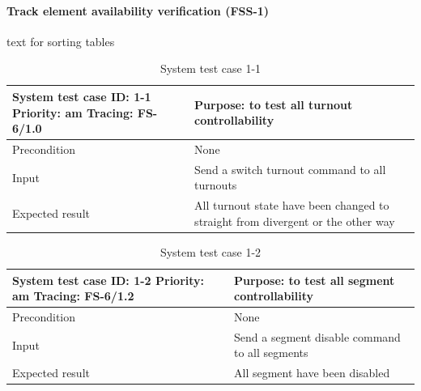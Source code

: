 \paragraph{Track element availability verification (FSS-1)} text for sorting tables
\begin{table}[H]
	\caption{System test case 1-1}
	\label{table:TCase-FSS1-1}
	\begin{center}
		\renewcommand{\arraystretch}{1.8}
		\begin{tabu} 
			to 0.9 \textwidth
			{  X[0.4, c] X[c] }
			\toprule
			System test case ID: 1-1 \newline Priority: am \newline Tracing: FS-6/1.0 & Purpose: to test all turnout controllability                                    \\ \midrule
			Precondition                                                              & None                                                                            \\
			Input                                                                     & Send a switch turnout command to all turnouts                                   \\
			Expected result                                                           & All turnout state have been changed to straight from divergent or the other way \\ \bottomrule
		\end{tabu}
	\end{center}
\end{table}

\begin{table}[H]
	\caption{System test case 1-2}
	\label{table:TCase-FSS1-2}
	\begin{center}
		\renewcommand{\arraystretch}{1.8}
		\begin{tabu} 
			to 0.9 \textwidth
			{  X[0.4, c] X[c] }
			\toprule
			System test case ID: 1-2 \newline Priority: am \newline Tracing: FS-6/1.2 & Purpose: to test all segment controllability   \\ \midrule
			Precondition                                                              & None                                           \\
			Input                                                                     & Send a segment disable command to all segments \\
			Expected result                                                           & All segment have been disabled                 \\ \bottomrule
		\end{tabu}
	\end{center}
\end{table}

